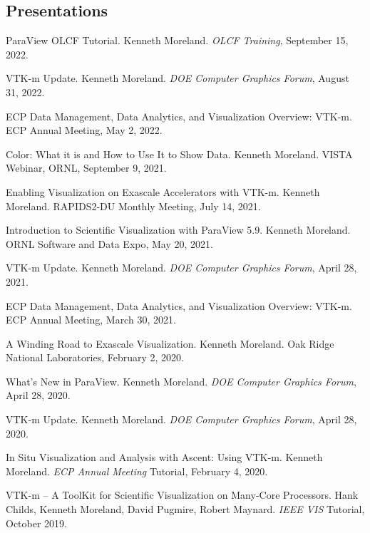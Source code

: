 \documentclass{article}
\begin{document}


\subsection*{Presentations}

\begin{enumerate}[label={[\arabic*]}]
\item ParaView OLCF Tutorial.
  Kenneth Moreland.
  \emph{OLCF Training}, September 15, 2022.
\item VTK-m Update.
  Kenneth Moreland.
  \emph{DOE Computer Graphics Forum}, August 31, 2022.
\item ECP Data Management, Data Analytics, and Visualization Overview: VTK-m.
  ECP Annual Meeting, May 2, 2022.
\item Color: What it is and How to Use It to Show Data.
  Kenneth Moreland.
  VISTA Webinar, ORNL, September 9, 2021.
\item Enabling Visualization on Exascale Accelerators with VTK-m.
  Kenneth Moreland.
  RAPIDS2-DU Monthly Meeting, July 14, 2021.
\item Introduction to Scientific Visualization with ParaView 5.9.
  Kenneth Moreland.
  ORNL Software and Data Expo, May 20, 2021.
\item VTK-m Update.
  Kenneth Moreland.
  \emph{DOE Computer Graphics Forum}, April 28, 2021.
\item ECP Data Management, Data Analytics, and Visualization Overview: VTK-m.
  ECP Annual Meeting, March 30, 2021.
\item A Winding Road to Exascale Visualization.
  Kenneth Moreland.
  Oak Ridge National Laboratories, February 2, 2020.
\item What's New in ParaView.
  Kenneth Moreland.
  \emph{DOE Computer Graphics Forum}, April 28, 2020.
\item VTK-m Update.
  Kenneth Moreland.
  \emph{DOE Computer Graphics Forum}, April 28, 2020.
\item In Situ Visualization and Analysis with Ascent: Using VTK-m.
  Kenneth Moreland.
  \emph{ECP Annual Meeting} Tutorial, February 4, 2020.
\item VTK-m -- A ToolKit for Scientific Visualization on Many-Core Processors.
  Hank Childs, Kenneth Moreland, David Pugmire, Robert Maynard.
  \emph{IEEE VIS} Tutorial, October 2019.

\end{enumerate}
\end{document}
